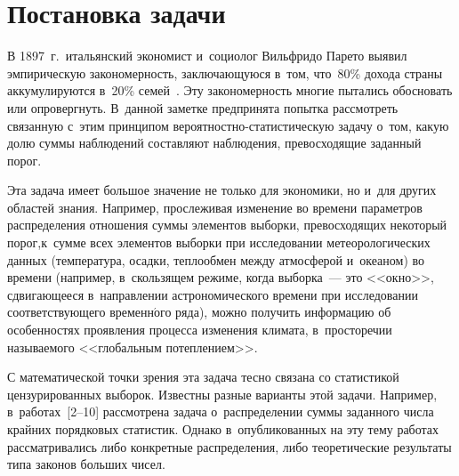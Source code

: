

\vspace*{-2pt}


\thispagestyle{headings}

\begin{multicols}{2}

\label{st\stat}


\section{Постановка задачи}

\vspace*{-4pt}

В 1897~г.\ итальянский экономист и~социолог Вильфридо Парето 
выявил эмпирическую закономерность, заключающуюся в~том, что~80\%
дохода страны аккумулируются в~20\%
семей~\cite{Koch1998}. Эту закономерность многие пытались обосновать 
или опровергнуть. В~данной заметке предпринята попытка рассмотреть 
связанную с~этим принципом ве\-ро\-ят\-ност\-но-ста\-ти\-сти\-че\-скую 
задачу о~том, какую долю суммы наблюдений составляют наблюдения, 
превосходящие заданный порог.

Эта задача имеет большое значение не только для экономики, но и~для 
других областей знания. Например, прослеживая изменение во времени 
параметров распределения отношения суммы элементов выборки, 
превосходящих некоторый порог,\linebreak к~сумме всех элементов выборки при 
исследовании метеорологических данных (температура, осадки, теплообмен 
между атмосферой и~океаном) во времени (например, в~скользящем режиме, 
когда выборка~--- это <<окно>>, сдвигающееся в~направлении астрономического 
времени при исследовании соответствующего временн$\acute{\mbox{о}}$го ряда), 
можно получить информацию об особенностях проявления процесса изменения 
климата, в~просторечии называемого <<глобальным по\-теп\-ле\-ни\-ем>>.

С математической точки зрения эта задача тесно связана со 
статистикой цензурированных выборок. Известны разные варианты этой задачи.
Например, в~работах~[2--10] рассмотрена задача о~распределении
суммы заданного числа крайних порядковых статистик. 
Однако в~опубликованных на эту тему работах рассматривались либо
конкретные распределения, либо теоретические результаты типа законов 
больших чисел.


\end{multicols}
